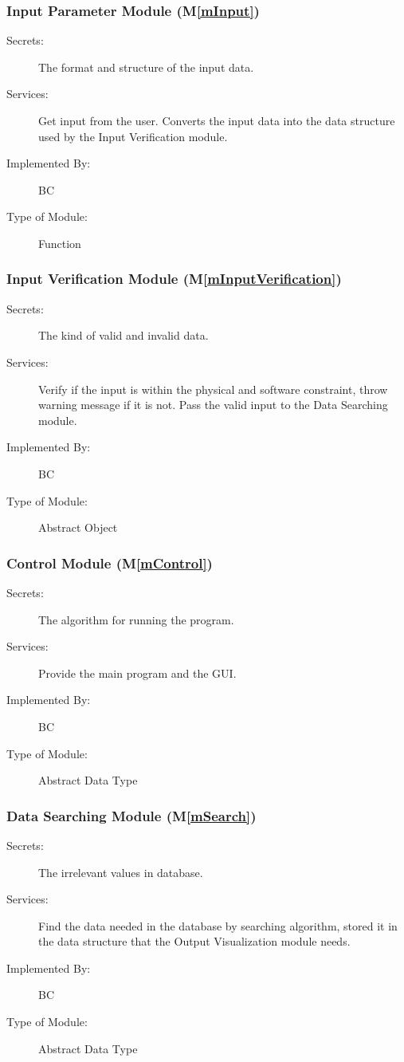 \documentclass[12pt, titlepage]{article}
\newcommand{\mref}[1]{M\ref{#1}}
\begin{document}
\subsubsection{Input Parameter Module (\mref{mInput})}

\begin{description}
\item[Secrets:] The format and structure of the input data. 
\item[Services:] Get input from the user. Converts the input data into the data structure used by the Input Verification module.
\item[Implemented By:] BC
\item[Type of Module:] Function
\end{description}


\subsubsection{Input Verification Module (\mref{mInputVerification})}

\begin{description}
\item[Secrets:] The kind of valid and invalid data. 
\item[Services:] Verify if the input is within the physical and software constraint, throw warning message if it is not. Pass the valid input to the Data Searching module.
\item[Implemented By:] BC
\item[Type of Module:] Abstract Object
\end{description}


\subsubsection{Control Module (\mref{mControl})}
\begin{description}
\item[Secrets:] The algorithm for running the program.
\item[Services:] Provide the main program and the GUI.
\item[Implemented By:] BC
\item[Type of Module:] Abstract Data Type
\end{description}

\subsubsection{Data Searching Module (\mref{mSearch})}
\begin{description}
\item[Secrets:] The irrelevant values in database.
\item[Services:] Find the data needed in the database by searching algorithm, stored it in the data structure that the Output Visualization module needs.
\item[Implemented By:] BC
\item[Type of Module:] Abstract Data Type
\end{description}
\end{document}
